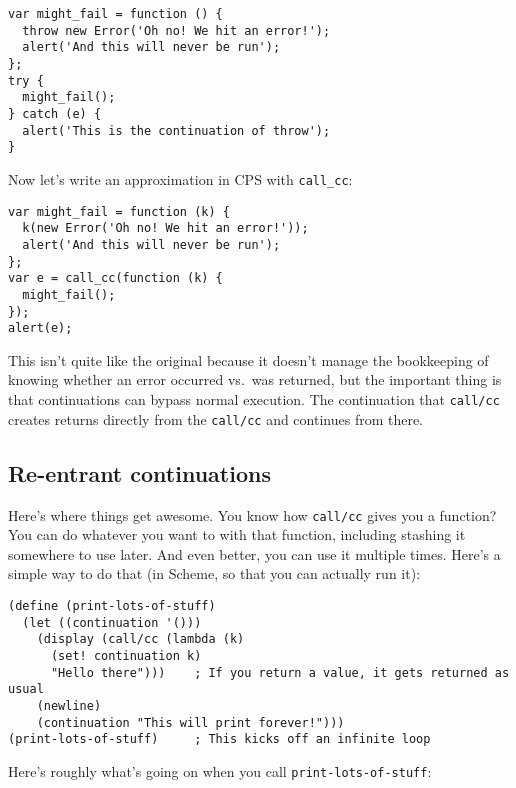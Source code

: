 \documentclass{article}
\begin{document}
\begin{verbatim}
var might_fail = function () {
  throw new Error('Oh no! We hit an error!');
  alert('And this will never be run');
};
try {
  might_fail();
} catch (e) {
  alert('This is the continuation of throw');
}
\end{verbatim}

    \noindent Now let's write an approximation in CPS with \verb|call_cc|:

\begin{verbatim}
var might_fail = function (k) {
  k(new Error('Oh no! We hit an error!'));
  alert('And this will never be run');
};
var e = call_cc(function (k) {
  might_fail();
});
alert(e);
\end{verbatim}

    This isn't quite like the original because it doesn't manage the bookkeeping of knowing whether an error occurred vs.~was returned, but the important thing is that continuations can bypass
    normal execution. The continuation that {\tt call/cc} creates returns directly from the {\tt call/cc} and continues from there.

\subsection{Re-entrant continuations}\label{sec:the-current-continuation-re-entrant-continuations}
    Here's where things get awesome. You know how {\tt call/cc} gives you a function? You can do whatever you want to with that function, including stashing it somewhere to use later. And even
    better, you can use it multiple times. Here's a simple way to do that (in Scheme, so that you can actually run it):

\begin{verbatim}
(define (print-lots-of-stuff)
  (let ((continuation '()))
    (display (call/cc (lambda (k)
      (set! continuation k)
      "Hello there")))    ; If you return a value, it gets returned as usual
    (newline)
    (continuation "This will print forever!")))
(print-lots-of-stuff)     ; This kicks off an infinite loop
\end{verbatim}

    Here's roughly what's going on when you call {\tt print-lots-of-stuff}:
\end{document}
